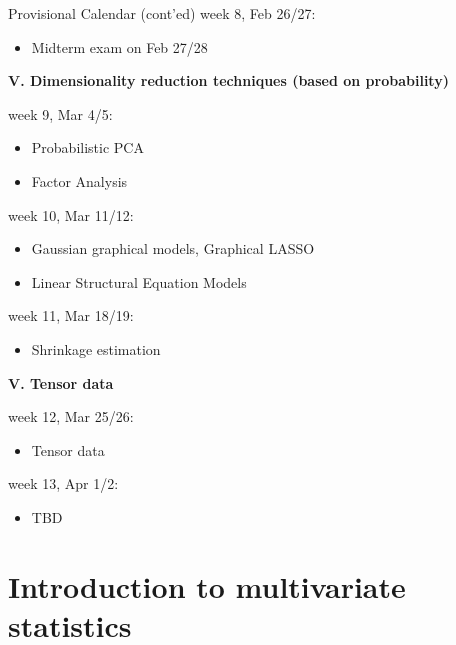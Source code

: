 \documentclass[11pt,handout,aspectratio=169]{beamer}
\begin{document}
\begin{frame}
{Provisional Calendar (cont'ed) }
\small
week 8,  Feb 26/27:\\[-1mm]
  \begin{itemize}
  \item \alert{Midterm exam on Feb 27/28}
\end{itemize}

\noindent \textbf{V. Dimensionality reduction techniques (based on probability)}

week 9, Mar 4/5:\\[-1mm]
\begin{itemize}
\item Probabilistic PCA
\item Factor Analysis
\end{itemize}

week 10, Mar 11/12:\\[-1mm]
\begin{itemize}
\item Gaussian graphical models, Graphical LASSO
\item Linear Structural Equation Models
\end{itemize}

week 11, Mar 18/19:\\[-1mm]
\begin{itemize}
\item Shrinkage estimation
\end{itemize}

\noindent \textbf{V. Tensor data}

week 12, Mar 25/26:\\[-1mm]
\begin{itemize}
\item Tensor data
\end{itemize}

 week 13, Apr 1/2:\\[-1mm]
\begin{itemize} 
\item TBD
\end{itemize}
\end{frame}

\section{Introduction to multivariate statistics}
\end{document}
